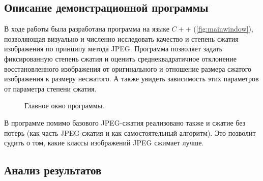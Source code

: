 \documentclass[12pt,a4paper]{article}
\begin{document}
        \subsection{Описание демонстрационной программы}

            В ходе работы была разработана программа на языке $C++$ (\autoref{fig:mainwindow}), позволяющая визуально и численно исследовать качество и степень сжатия изображения по принципу метода JPEG. Программа позволяет задать фиксированную степень сжатия и оценить среднеквадратичное отклонение восстановленного изображения от оригинального и отношение размера сжатого изображения к размеру несжатого. А также увидеть зависимость этих параметров от параметра степени сжатия.
            \begin{figure}[!htb]%
                \centering
                \hspace{8pt}%
                \caption[]{Главное окно программы.}%
                \label{fig:mainwindow}%
            \end{figure}

            В программе помимо базового JPEG-сжатия реализовано также и сжатие без потерь (как часть JPEG-сжатия и как самостоятельный алгоритм). Это позволит судить о том, какие классы изображений JPEG сжимает лучше.


        \subsection{Анализ результатов}
\end{document}
